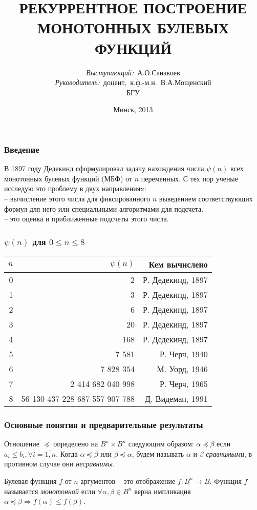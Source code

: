\documentclass[14pt]{beamer}
\title{\small{РЕКУРРЕНТНОЕ ПОСТРОЕНИЕ МОНОТОННЫХ БУЛЕВЫХ ФУНКЦИЙ}}
\author{\small{%
\emph{Выступающий:}~А.О.Санакоев\\%
\emph{Руководитель:}~доцент,~к.ф.-м.н.~В.А.Мощенский}\\%
\vspace{30pt}%
БГУ
\vspace{20pt}%
}
\date{\small{Минск, 2013}}
\theoremstyle{plain} %
\theoremstyle{remark}
\newcommand{\al}{\alpha}
\newcommand{\be}{\beta}
\newcommand\T{\rule{0pt}{2.6ex}}       %
\newcommand\B{\rule[-1.2ex]{0pt}{0pt}} %
\begin{document}
\maketitle


\begin{frame}
\frametitle{Введение}
В 1897 году Дедекинд сформулировал задачу нахождения числа $\psi(n)$ всех монотонных булевых функций (МБФ) 
 от $n$ переменных.
 С тех пор ученые исследую это проблему в двух
 направленияx:\\
 -- вычисление этого числа для фиксированного $n$
 выведением соответствующих формул для него или специальными
 алгоритмами для подсчета.\\ 
 -- это оценка и приближенные подсчеты этого числа.
\end{frame}

\begin{frame}
\frametitle{$\psi(n)$ для $0 \leq n \leq 8$}
\begin{center}
 \begin{tabular}{ r | r | r } 
  $n$ & $\psi(n)$ & Кем вычислено \\
  \hline
  0 & 	2				& \T Р. Дедекинд, 1897 \\
  1 & 	3 				& Р. Дедекинд, 1897 \\
  2 & 	6 				& Р. Дедекинд, 1897 \\
  3 & 	20 				& Р. Дедекинд, 1897 \\
  4 & 	168 				& Р. Дедекинд, 1897 \\
  5 & 	7 581 				& Р. Черч, 1940 \\
  6 &	7 828 354			& М. Уорд, 1946 \\
  7 &	2 414 682 040 998 		& Р. Черч, 1965 \\
  8 &	56 130 437 228 687 557 907 788 	& \B Д. Видеман, 1991 \\
  \hline
  \end{tabular}
\end{center}
\end{frame}

\begin{frame}
\frametitle{Основные понятия и предварительные результаты}
Отношение $\preceq$ определено на $B^n \times B^n$ следующим образом:
$\alpha \preceq \beta$  если 
$a_i \leq b_i, \forall i = \overline{1,n}$. 
Когда $\alpha \preceq \beta$ или $\beta \preceq \alpha$, будем называть
$\al$ и $\be$ \emph{сравнимыми}, в противном случае они \emph{несравнимы}.\par
  Булевая функция $f$ от $n$ аргументов -- это отображение 
$f : B^n \rightarrow B$. Функция $f$ называется \emph{монотонной} 
если $\forall \al, \be \in B^n$ верна импликация 
$\al \preceq \be \Rightarrow f(\al) \leq f(\be)$.
\end{frame}
\end{document}
